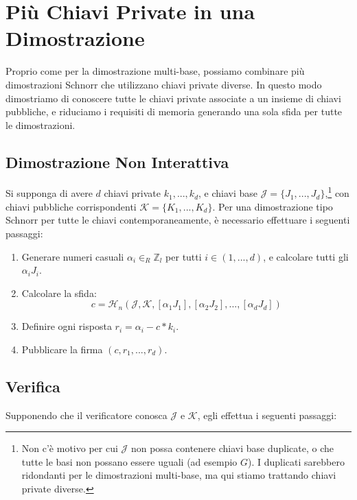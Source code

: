 \section{Più Chiavi Private in una Dimostrazione}
\label{sec:multiple_private_keys_in_one_proof}

Proprio come per la dimostrazione multi-base, possiamo combinare più dimostrazioni Schnorr che utilizzano chiavi private diverse. In questo modo dimostriamo di conoscere tutte le chiavi private associate a un insieme di chiavi pubbliche, e riduciamo i requisiti di memoria generando una sola sfida per tutte le dimostrazioni.


\subsection*{Dimostrazione Non Interattiva}

Si supponga di avere $d$ chiavi private $k_1,...,k_d$, e chiavi base $\mathcal{J} = \{J_1,...,J_d\}$,\footnote{Non c'è motivo per cui $\mathcal{J}$ non possa contenere chiavi base duplicate, o che tutte le basi non possano essere uguali (ad esempio $G$). I duplicati sarebbero ridondanti per le dimostrazioni multi-base, ma qui stiamo trattando chiavi private diverse.} con chiavi pubbliche corrispondenti $\mathcal{K} = \{K_1,...,K_d\}$. Per una dimostrazione tipo Schnorr per tutte le chiavi contemporaneamente, è necessario effettuare i seguenti passaggi:

\begin{enumerate}
	\item Generare numeri casuali $\alpha_i \in_R \mathbb{Z}_l$ per tutti $i \in (1,...,d)$, e calcolare tutti gli $\alpha_i J_i$.
	\item Calcolare la sfida:\vspace{.175cm}
	\[c = \mathcal{H}_n(\mathcal{J},\mathcal{K},[\alpha_1 J_1],[\alpha_2 J_2],...,[\alpha_d J_d])\]
	\item Definire ogni risposta $r_i = \alpha_i - c*k_i$.
	\item Pubblicare la firma $(c, r_1,...,r_d)$.
\end{enumerate}


\subsection*{Verifica}

Supponendo che il verificatore conosca $\mathcal{J}$ e $\mathcal{K}$, egli effettua i seguenti passaggi:


